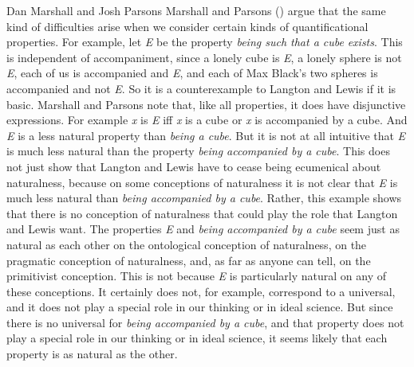 \documentclass[
  11pt,
  letterpaper,
  DIV=11,
  numbers=noendperiod,
  twoside]{scrartcl}
\begin{document}
Dan Marshall and Josh Parsons Marshall and Parsons
() argue that the same kind of
difficulties arise when we consider certain kinds of quantificational
properties. For example, let \emph{E} be the property \emph{being such
that a cube} \emph{exists}. This is independent of accompaniment, since
a lonely cube is \emph{E}, a lonely sphere is not \emph{E}, each of us
is accompanied and \emph{E}, and each of Max Black's two spheres is
accompanied and not \emph{E}. So it is a counterexample to Langton and
Lewis if it is basic. Marshall and Parsons note that, like all
properties, it does have disjunctive expressions. For example \emph{x}
is \emph{E} iff \emph{x} is a cube or \emph{x} is accompanied by a cube.
And \emph{E} is a less natural property than \emph{being a cube}. But it
is not at all intuitive that \emph{E} is much less natural than the
property \emph{being accompanied by a cube}. This does not just show
that Langton and Lewis have to cease being ecumenical about naturalness,
because on some conceptions of naturalness it is not clear that \emph{E}
is much less natural than \emph{being accompanied by a cube}. Rather,
this example shows that there is no conception of naturalness that could
play the role that Langton and Lewis want. The properties \emph{E} and
\emph{being accompanied by a cube} seem just as natural as each other on
the ontological conception of naturalness, on the pragmatic conception
of naturalness, and, as far as anyone can tell, on the primitivist
conception. This is not because \emph{E} is particularly natural on any
of these conceptions. It certainly does not, for example, correspond to
a universal, and it does not play a special role in our thinking or in
ideal science. But since there is no universal for \emph{being
accompanied by a cube}, and that property does not play a special role
in our thinking or in ideal science, it seems likely that each property
is as natural as the other.
\end{document}
